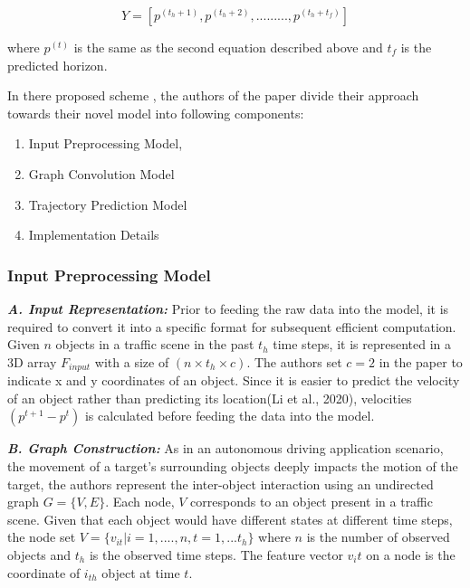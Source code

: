 \begin{equation}
    Y = [p^{(t_h+1)}, p^{(t_h+2)},........., p^{(t_h+t_f)}]
\end{equation}

where \(p^{(t)}\) is the same as the second equation described above and \(t_f\) is the predicted horizon.

\tab In there proposed scheme , the authors of the paper divide their approach towards their novel model into following components: 
\begin{enumerate}
    \item Input Preprocessing Model,
    \item Graph Convolution Model
    \item Trajectory Prediction Model
    \item Implementation Details
\end{enumerate}

\subsubsection{Input Preprocessing Model}

\textbf{\textit{A. Input Representation:}} Prior to feeding the raw data into the model, it is required to convert it into a specific format for subsequent efficient computation. Given \(n\) objects in a traffic scene in the past \(t_h\) time steps, it is represented in a 3D array \(F_{input}\) with a size of \((n \times t_h \times c)\). The authors set \(c= 2\) in the paper to indicate x and y coordinates of an object. Since it is easier to predict the velocity of an object rather than predicting its location(Li et al., 2020), velocities \((p^{t+1} - p^t)\) is calculated before feeding the data into the model. 

\textbf{\textit{B. Graph Construction:}} As in an autonomous driving application scenario, the movement of a target’s surrounding objects deeply impacts the motion of the target, the authors represent the inter-object interaction using an undirected graph \(G= \{V, E\}\). Each node, \(V\) corresponds to an object present in a traffic scene. Given that each object would have different states at different time steps, the node set \(V = \{v_{it}| i=1,....,n, t =1,...t_h\}\) where \(n\) is the number of observed objects and \(t_h\) is the observed time steps. The feature vector \(v_it\) on a node is the coordinate of \(i_{th}\) object at time \(t\).

